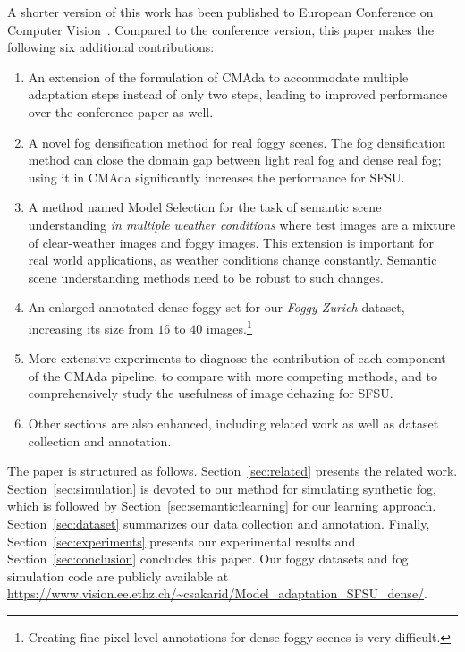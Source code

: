 \documentclass[twocolumn]{svjour3}          \smartqed  \usepackage{graphicx}
\begin{document}
A shorter version of this work has been published to European Conference on Computer Vision~\cite{dense:SFSU:eccv18}. Compared to the conference version, this paper makes the following six additional contributions: 
\begin{enumerate}
    \item An extension of the formulation of CMAda to accommodate multiple adaptation steps instead of only two steps, leading to improved performance over the conference paper as well.
    \item A novel fog densification method for real foggy scenes. The fog densification method can close the domain gap between light real fog and dense real fog; using it in CMAda significantly increases the performance for SFSU.
    \item A method named Model Selection for the task of semantic scene understanding \emph{in multiple weather conditions} where test images are a mixture of clear-weather images and foggy images. This extension is important for real world applications, as weather conditions change constantly. Semantic scene understanding methods need to be robust to such changes.
    \item An enlarged annotated dense foggy set for our \emph{Foggy Zurich} dataset, increasing its size from $16$ to $40$ images.\footnote{Creating fine pixel-level annotations for dense foggy scenes is very difficult.}
    \item More extensive experiments to diagnose the contribution of each component of the CMAda pipeline, to compare with more competing methods, and to comprehensively study the usefulness of image dehazing for SFSU. 
    \item Other sections are also enhanced, including related work as well as dataset collection and annotation. 
\end{enumerate}

The paper is structured as follows. Section~\ref{sec:related} presents the related work. Section~\ref{sec:simulation} is devoted to our method for simulating synthetic fog, which is followed by Section~\ref{sec:semantic:learning} for our learning approach. Section~\ref{sec:dataset} summarizes our data collection and annotation. Finally, Section~\ref{sec:experiments} presents our experimental results and Section~\ref{sec:conclusion} concludes this paper. Our foggy datasets and fog simulation code are publicly available at \url{https://www.vision.ee.ethz.ch/~csakarid/Model_adaptation_SFSU_dense/}.
\end{document}
